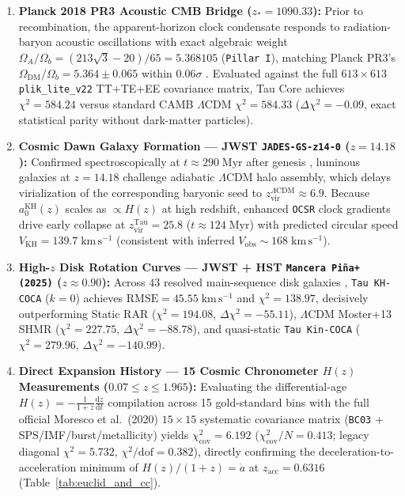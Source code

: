 \documentclass[11pt,a4paper]{article}
\theoremstyle{remark}
\begin{document}
\begin{enumerate}
  \item \textbf{Planck 2018 PR3 Acoustic CMB Bridge ($z_* = 1090.33$):} Prior to recombination, the apparent-horizon clock condensate responds to radiation-baryon acoustic oscillations with exact algebraic weight $\Omega_A/\Omega_b = (213\sqrt{3}-20)/65 = 5.368105$ (\texttt{Pillar I}), matching Planck PR3's $\Omega_{\mathrm{DM}}/\Omega_b = 5.364 \pm 0.065$ within \textbf{$0.06\sigma$} \cite{Planck2018VI}. Evaluated against the full $613 \times 613$ \texttt{plik\_lite\_v22} TT+TE+EE covariance matrix, Tau Core achieves $\chi^2 = 584.24$ versus standard CAMB $\Lambda\mathrm{CDM}$ $\chi^2 = 584.33$ ($\Delta\chi^2 = -0.09$, exact statistical parity without dark-matter particles).
  \item \textbf{Cosmic Dawn Galaxy Formation --- JWST \texttt{JADES-GS-z14-0} ($z = 14.18$):} Confirmed spectroscopically at $t \approx 290\;\mathrm{Myr}$ after genesis \cite{Carniani2024JADESz14}, luminous galaxies at $z = 14.18$ challenge adiabatic $\Lambda\mathrm{CDM}$ halo assembly, which delays virialization of the corresponding baryonic seed to $z_{\mathrm{vir}}^{\Lambda\mathrm{CDM}} \approx 6.9$. Because $a_0^{\mathrm{KH}}(z)$ scales as $\propto H(z)$ at high redshift, enhanced \texttt{OCSR} clock gradients drive early collapse at $z_{\mathrm{vir}}^{\mathrm{Tau}} = 25.8$ ($t \approx 124\;\mathrm{Myr}$) with predicted circular speed $V_{\mathrm{KH}} = 139.7\;\mathrm{km\,s^{-1}}$ (consistent with inferred $V_{\mathrm{obs}} \sim 168\;\mathrm{km\,s^{-1}}$).
  \item \textbf{High-$z$ Disk Rotation Curves --- JWST + HST \texttt{Mancera Pi\~na+ (2025)} ($z \approx 0.90$):} Across $43$ resolved main-sequence disk galaxies \cite{ManceraPina2025}, \texttt{Tau KH-COCA} ($k = 0$) achieves $\mathrm{RMSE} = 45.55\;\mathrm{km\,s^{-1}}$ and $\chi^2 = 138.97$, decisively outperforming Static RAR ($\chi^2 = 194.08$, $\Delta\chi^2 = -55.11$), $\Lambda\mathrm{CDM}$ Moster+13 SHMR ($\chi^2 = 227.75$, $\Delta\chi^2 = -88.78$), and quasi-static \texttt{Tau Kin-COCA} ($\chi^2 = 279.96$, $\Delta\chi^2 = -140.99$).
  \item \textbf{Direct Expansion History --- 15 Cosmic Chronometer $H(z)$ Measurements ($0.07 \le z \le 1.965$):} Evaluating the differential-age $H(z) = -\frac{1}{1+z}\frac{\mathrm{d}z}{\mathrm{d}t}$ compilation \cite{Moresco2022CC} across 15 gold-standard bins with the full official Moresco et al.\ (2020) $15\times 15$ systematic covariance matrix (\texttt{BC03} + SPS/IMF/burst/metallicity) yields $\chi^2_{\mathrm{cov}} = 6.192$ ($\chi^2_{\mathrm{cov}}/N = 0.413$; legacy diagonal $\chi^2 = 5.732$, $\chi^2/\mathrm{dof} = 0.382$), directly confirming the deceleration-to-acceleration minimum of $H(z)/(1+z) = \dot{a}$ at $z_{\mathrm{acc}} = 0.6316$ (Table~\ref{tab:euclid_and_cc}).

\end{enumerate}
\end{document}
